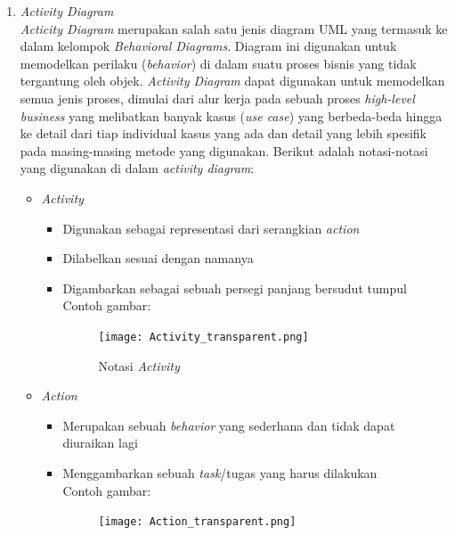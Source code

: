 \documentclass[a4paper]{article}
\begin{document}
\begin{enumerate}
    \item \textit{Activity Diagram}\\
    \textit{Acticity Diagram} merupakan salah satu jenis diagram UML yang termasuk ke dalam kelompok \textit{Behavioral Diagrams}. Diagram ini digunakan untuk memodelkan perilaku (\textit{behavior}) di dalam suatu proses bisnis yang tidak tergantung oleh objek. \textit{Activity Diagram} dapat digunakan untuk memodelkan semua jenis proses, dimulai dari alur kerja pada sebuah proses \textit{high-level business} yang melibatkan banyak kasus (\textit{use case}) yang berbeda-beda hingga ke detail dari tiap individual kasus yang ada dan detail yang lebih spesifik pada masing-masing metode yang digunakan\autocite{systemanalysisdesign-activity-diagram}. Berikut adalah notasi-notasi yang digunakan di dalam \textit{activity diagram}:
    \begin{itemize}
        \item \textit{Activity}
        \begin{itemize}
            \item Digunakan sebagai representasi dari serangkian \textit{action}
            \item Dilabelkan sesuai dengan namanya
            \item Digambarkan sebagai sebuah persegi panjang bersudut tumpul\autocite{systemanalysisdesign-activity-diagram}\\
                  Contoh gambar:\\
                  \begin{figure}[h]
                    \centering
                    \texttt{[image: Activity\_transparent.png]}
                    \caption{Notasi \textit{Activity}}
                  \end{figure}
        \end{itemize}
        \item \textit{Action}
        \begin{itemize}
            \item Merupakan sebuah \textit{behavior} yang sederhana dan tidak dapat diuraikan lagi
            \item Menggambarkan sebuah \textit{task}/tugas yang harus dilakukan\autocite{systemanalysisdesign-activity-diagram}\\
                  Contoh gambar:\\
                  \begin{figure}[h]
                    \centering
                    \texttt{[image: Action\_transparent.png]}

\end{figure}
\end{itemize}
\end{itemize}
\end{enumerate}
\end{document}
